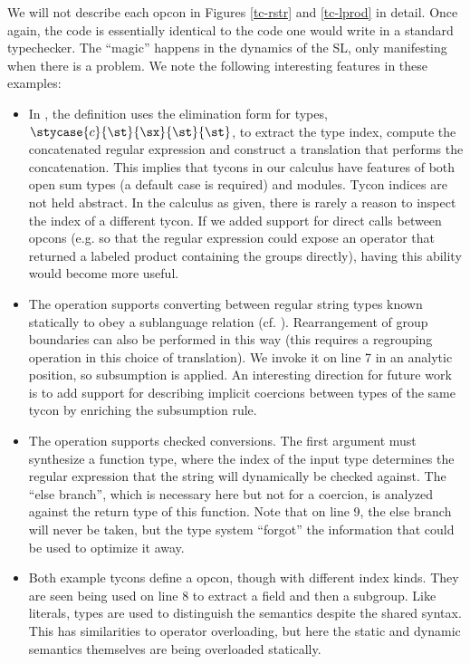 We will not describe each opcon in Figures \ref{tc-rstr} and \ref{tc-lprod} in detail. Once again, the code is essentially identical to the code one would write in a standard typechecker. The ``magic'' happens in the dynamics of the SL, only manifesting when there is a problem. We note the following interesting features in these examples:
\begin{itemize}
\item In , the definition uses the elimination form for types, $\stycase{c}{\st}{\sx}{\st}{\st}$, to extract the type index, compute the concatenated regular expression and construct a translation that performs the concatenation. This implies that tycons in our calculus have features of both open sum types (a default case is required) and modules. Tycon indices are not held abstract. In the calculus as given, there is rarely a reason to inspect the index of a different tycon. If we added support for direct calls between opcons (e.g. so that the regular expression could expose an operator that returned a labeled product containing the groups directly), having this ability would become more useful.
\item The  operation supports converting between regular string types known statically to obey a sublanguage relation (cf. \cite{conf/cpp/DoczkalKS13}). Rearrangement of group boundaries can also be performed in this way (this requires a regrouping operation in this choice of translation). We invoke it on line 7 in an analytic position, so subsumption is applied. An interesting direction for future work is to add support for describing implicit coercions between types of the same tycon by enriching the subsumption rule.
\item The  operation supports checked conversions. The first argument must synthesize a function type, where the index of the input type determines the regular expression that the string will dynamically be checked against. The ``else branch'', which is necessary here but not for a coercion, is analyzed against the return type of this function. Note that on line 9, the else branch will never be taken, but the type system ``forgot'' the information that could be used to optimize it away.
\item Both example tycons define a \opname{\#} opcon, though with different index kinds. They are seen being used on line 8 to extract a field and then a subgroup. Like literals, types are used to distinguish the semantics despite the shared syntax. This has similarities to operator overloading, but here the static and dynamic semantics themselves are being overloaded statically. %

\end{itemize}
